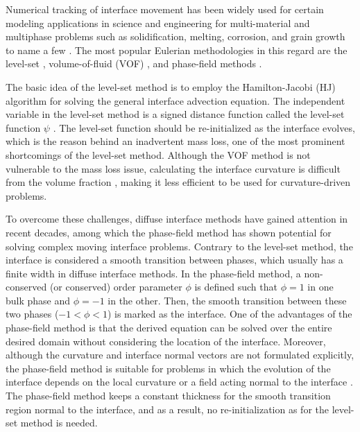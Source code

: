 Numerical tracking of interface movement has been widely used for certain modeling applications in science and engineering for multi-material and multiphase problems such as solidification, melting, corrosion, and grain growth to name a few \cite{Sun2007}. The most popular Eulerian methodologies in this regard are the level-set \cite{Osher1988,Andrew2000,RonaldFedkiw2002}, volume-of-fluid ({VOF}) \cite{Rider1998}, and phase-field methods \cite{Boettinger2002,Bellemans2017}.

The basic idea of the level-set method is to employ the Hamilton-Jacobi ({HJ}) algorithm for solving the general interface advection equation. The independent variable in the level-set method is a signed distance function called the level-set function $\psi$ \cite{RonaldFedkiw2002}. The level-set function should be re-initialized as the interface evolves, which is the reason behind an inadvertent mass loss, one of the most prominent shortcomings of the level-set method. Although the {VOF} method is not vulnerable to the mass loss issue, calculating the interface curvature is difficult from the volume fraction \cite{Sun2007}, making it less efficient to be used for curvature-driven problems.

To overcome these challenges, diffuse interface methods \cite{Anderson1998} have gained attention in recent decades, among which the phase-field method has shown potential for solving complex moving interface problems. Contrary to the level-set method, the interface is considered a smooth transition between phases, which usually has a finite width in diffuse interface methods. In the phase-field method, a non-conserved (or conserved) order parameter $\phi$ is defined such that $\phi=1$ in one bulk phase and $\phi=-1$ in the other. Then, the smooth transition between these two phases ($-1<\phi<1$) is marked as the interface. One of the advantages of the phase-field method is that the derived equation can be solved over the entire desired domain without considering the location of the interface. Moreover, although the curvature and interface normal vectors are not formulated explicitly, the phase-field method is suitable for problems in which the evolution of the interface depends on the local curvature or a field acting normal to the interface \cite{Sun2007}. The phase-field method keeps a constant thickness for the smooth transition region normal to the interface, and as a result, no re-initialization as for the level-set method is needed.



